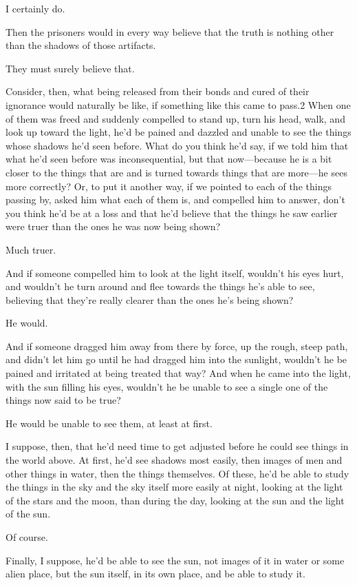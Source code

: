 			I certainly do. 

			Then the prisoners would in every way believe that the truth is nothing other than the shadows of those artifacts. 

			They must surely believe that. 

			Consider, then, what being released from their bonds and cured of their ignorance would naturally be like, if something like this came to pass.2 When one of them was freed and suddenly compelled to stand up, turn his head, walk, and look up toward the light, he'd be pained and dazzled and unable to see the things whose shadows he'd seen before. What do you think he'd say, if we told him that what he'd seen before was inconsequential, but that now---because he is a bit closer to the things that are and is turned towards things that are more---he sees more correctly? Or, to put it another way, if we pointed to each of the things passing by, asked him what each of them is, and compelled him to answer, don't you think he'd be at a loss and that he'd believe that the things he saw earlier were truer than the ones he was now being shown? 

			Much truer. 

			And if someone compelled him to look at the light itself, wouldn't his eyes hurt, and wouldn't he turn around and flee towards the things he's able to see, believing that they're really clearer than the ones he's being shown? 

			He would. 

			And if someone dragged him away from there by force, up the rough, steep path, and didn't let him go until he had dragged him into the sunlight, wouldn't he be pained and irritated at being treated that way? And when he came into the light, with the sun filling his eyes, wouldn't he be unable to see a single one of the things now said to be true? 

			He would be unable to see them, at least at first. 

			I suppose, then, that he'd need time to get adjusted before he could see things in the world above. At first, he'd see shadows most easily, then images of men and other things in water, then the things themselves. Of these, he'd be able to study the things in the sky and the sky itself more easily at night, looking at the light of the stars and the moon, than during the day, looking at the sun and the light of the sun. 

			Of course. 

			Finally, I suppose, he'd be able to see the sun, not images of it in water or some alien place, but the sun itself, in its own place, and be able to study it. 

